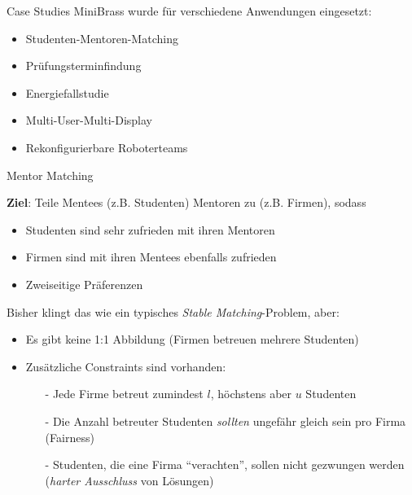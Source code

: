 
\begin{frame}{Case Studies}
MiniBrass wurde für verschiedene Anwendungen eingesetzt:

\vspace*{2ex}

\begin{itemize}
\item \alert<2->{Studenten-Mentoren-Matching}
\item \alert<2->{Prüfungsterminfindung}
\item \alert<2->{Energiefallstudie}
\item Multi-User-Multi-Display
\item Rekonfigurierbare Roboterteams
\end{itemize}
\end{frame}



\begin{frame}[fragile]{Mentor Matching}

\textbf{Ziel}: Teile Mentees (z.B. Studenten) Mentoren zu (z.B. Firmen), sodass
\begin{itemize}
\item Studenten sind sehr zufrieden mit ihren Mentoren
\item Firmen sind mit ihren Mentees ebenfalls zufrieden
\item Zweiseitige Präferenzen
\end{itemize}

\vspace*{2ex}

Bisher klingt das wie ein typisches \emph{Stable Matching}-Problem, aber:

\begin{itemize}
\item Es gibt keine 1:1 Abbildung (Firmen betreuen mehrere Studenten)
\item Zusätzliche Constraints sind vorhanden:
\begin{itemize}
\item[-] Jede Firme betreut zumindest $l$, höchstens aber $u$ Studenten
\item[-] Die Anzahl betreuter Studenten \emph{sollten} ungefähr gleich sein pro Firma (Fairness)
\item[-] Studenten, die eine Firma ``verachten'', sollen nicht gezwungen werden (\emph{harter Ausschluss} von Lösungen)
\end{itemize}
\end{itemize}
\end{frame}


